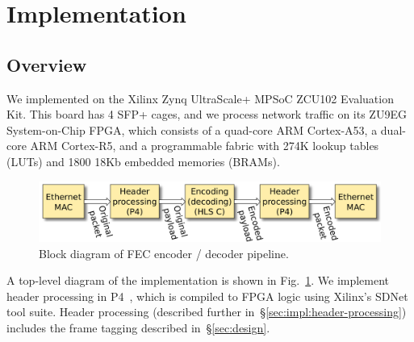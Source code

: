 \section{Implementation}
\label{sec:implementation}

\newcommand{\hg}[1]{{\color{green}{[\textbf{Hans Comment:} #1]}}}

\subsection{Overview}
We implemented \OurSys
on the Xilinx Zynq UltraScale+ MPSoC ZCU102 Evaluation Kit.  This board has 4 SFP+ cages, and we process network traffic on its
ZU9EG System-on-Chip FPGA, which consists of a quad-core ARM Cortex-A53, a
dual-core ARM Cortex-R5, and a programmable fabric with 274K lookup tables
(LUTs) and 1800 18Kb embedded memories (BRAMs).

\begin{figure}
  \centering
  \includegraphics[width=0.4\paperwidth]{Top_level.pdf}
  \caption{\label{fig:toplevel} Block diagram of FEC encoder / decoder pipeline.
  }
\end{figure}

A top-level diagram of the implementation is shown in Fig.~\ref{fig:toplevel}.
%
We implement header processing in
P4~\cite{Bosshart:2014:PPP:2656877.2656890}, which is compiled to FPGA
logic using Xilinx's SDNet tool suite.  Header processing (described
further in~\S\ref{sec:impl:header-processing}) includes the frame
tagging described in~\S\ref{sec:design}.

